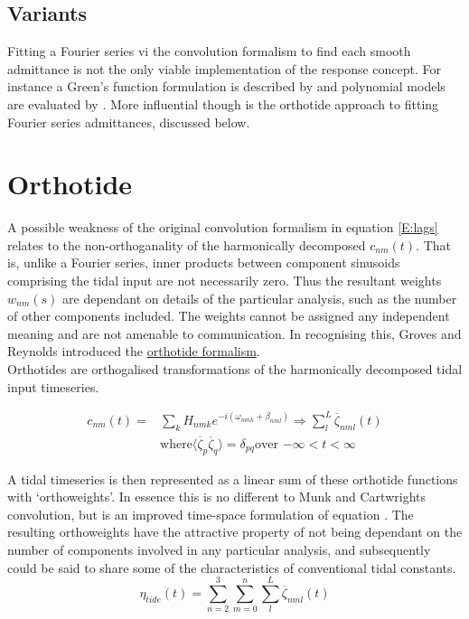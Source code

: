 \subsection{Variants}
Fitting a Fourier series vi the convolution formalism to find each smooth admittance is not the only viable implementation of the response concept.  For instance a Green's function formulation is described by \citet{Webb:1974ke} and polynomial models are evaluated by \citet{Desai:1995je}. More influential though is the orthotide approach to fitting Fourier series admittances, discussed below.




\section{Orthotide}%
A possible weakness of the original convolution formalism in equation \ref{E:lags} relates to the non-orthoganality of the harmonically decomposed $c_{nm}(t)$.  That is, unlike a Fourier series, inner products between component sinusoids comprising the tidal input are not necessarily zero.   Thus the resultant weights $w_{nm}(s)$ are dependant on details of the particular analysis, such as the number of other components included.  The weights cannot be assigned any independent meaning and are not amenable to communication.  In recognising this, Groves and Reynolds \citep {Groves:1975ky} introduced the \underline{orthotide formalism}.\\
Orthotides are orthogalised transformations of the harmonically decomposed tidal input timeseries.

\begin{align}
c_{nm}(t) =  &\sum_{k} H_{nmk} e^{-i(\omega_{nmk} + \beta_{nml})}  \Rightarrow \sum_{l}^L \overline{\zeta}_{nml}(t)     \nonumber \\
             &\mbox{where} \langle \overline{\zeta}_p \overline{\zeta}_q \rangle  = \delta_{pq}  \mbox{over $-\infty < t < \infty$}             \nonumber
\end{align}

A tidal timeseries is then represented as a linear sum of these orthotide functions with `orthoweights'. In essence this is no different to Munk and Cartwrights convolution, but is an improved time-space formulation of equation \label{E:Z}.  The resulting orthoweights have the attractive property of not being dependant on the number of components involved in any particular analysis, and subsequently could be said to share some of the characteristics of conventional tidal constants.
\begin{equation}
\label{E:orthosum}
\eta_{tide}(t) = \sum_{n=2}^3 \sum_{m=0}^n \sum_{l}^L \overline{\zeta}_{nml}(t)
\end{equation}

